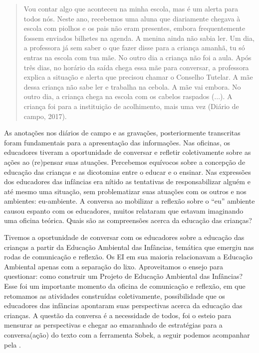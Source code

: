 \documentclass{textolivre}
\begin{document}
\begin{quote}
Vou contar algo que aconteceu na minha escola, mas é um alerta para todos nós. Neste ano, recebemos uma aluna que diariamente chegava à escola com piolhos e os pais não eram presentes, embora frequentemente fossem enviados bilhetes na agenda. A menina ainda não sabia ler. Um dia, a professora já sem saber o que fazer disse para a criança amanhã, tu só entras na escola com tua mãe. No outro dia a criança não foi a aula. Após três dias, no horário da saída chega essa mãe para conversar, a professora explica a situação e alerta que precisou chamar o Conselho Tutelar. A mãe dessa criança não sabe ler e trabalha na cebola. A mãe vai embora. No outro dia, a criança chega na escola com os cabelos raspados (...). A criança foi para a instituição de acolhimento, mais uma vez (Diário de campo, 2017).
\end{quote}

As anotações nos diários de campo e as gravações, posteriormente transcritas foram fundamentais para a apresentação das informações. Nas oficinas, os educadores tiveram a oportunidade de conversar e refletir coletivamente sobre as ações ao (re)pensar suas atuações. Percebemos equívocos sobre a concepção de educação das crianças e as dicotomias entre o educar e o ensinar. Nas expressões dos educadores das infâncias era nítido as tentativas de responsabilizar alguém e até mesmo uma situação, sem problematizar suas atuações com os outros e nos ambientes: eu-ambiente. A conversa ao mobilizar a reflexão sobre o “eu” ambiente causou espanto com os educadores, muitos relataram que estavam imaginando uma oficina teórica. Quais são as compreensões acerca da educação das crianças? 

Tivemos a oportunidade de conversar com os educadores sobre a educação das crianças a partir da Educação Ambiental das Infâncias, temática que emergiu nas rodas de comunicação e reflexão. Os EI em sua maioria relacionavam a Educação Ambiental apenas com a separação do lixo. Aproveitamos o ensejo para questionar: como construir um Projeto de Educação Ambiental das Infâncias? Esse foi um importante momento da oficina de comunicação e reflexão, em que retomamos as atividades construídas coletivamente, possibilidade que os educadores das infâncias apontaram suas perspectivas acerca da educação das crianças. A questão da conversa é a necessidade de todos, foi o esteio para mensurar as perspectivas e chegar ao emaranhado de estratégias para a conversa(ação) do texto com a ferramenta Sobek, a seguir podemos acompanhar pela . 
\end{document}
